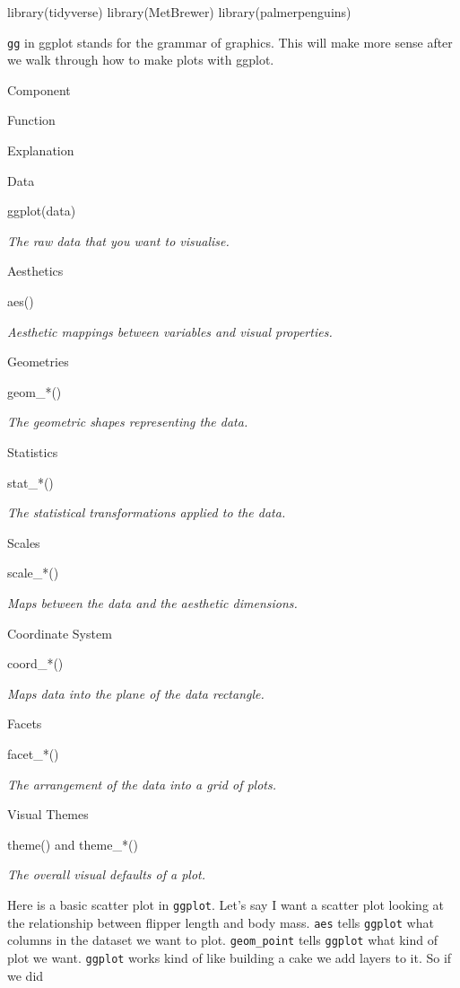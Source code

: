 \documentclass[
  letterpaper,
  DIV=11,
  numbers=noendperiod,
  oneside]{scrreprt}
\newenvironment{Shaded}{\begin{snugshade}}{\end{snugshade}}
\newcommand{\FunctionTok}[1]{\textcolor[rgb]{0.28,0.35,0.67}{#1}}
\newcommand{\NormalTok}[1]{\textcolor[rgb]{0.00,0.23,0.31}{#1}}
\begin{document}
\begin{Shaded}
\begin{Highlighting}[]
\FunctionTok{library}\NormalTok{(tidyverse)}
\FunctionTok{library}\NormalTok{(MetBrewer)}
\FunctionTok{library}\NormalTok{(palmerpenguins)}
\end{Highlighting}
\end{Shaded}

\texttt{gg} in ggplot stands for the grammar of graphics. This will make
more sense after we walk through how to make plots with ggplot.

Component

Function

Explanation

Data

ggplot(data)~~~~~~~~~

\emph{The raw data that you want to visualise.}

Aesthetics~~~~~~~~~~

aes()

\emph{Aesthetic mappings between variables and visual properties.}

Geometries

geom\_*()

\emph{The geometric shapes representing the data.}

Statistics

stat\_*()

\emph{The statistical transformations applied to the data.}

Scales

scale\_*()

\emph{Maps between the data and the aesthetic dimensions.}

Coordinate System

coord\_*()

\emph{Maps data into the plane of the data rectangle.}

Facets

facet\_*()

\emph{The arrangement of the data into a grid of plots.}

Visual Themes

theme() and theme\_*()

\emph{The overall visual defaults of a plot.}

Here is a basic scatter plot in \texttt{ggplot}. Let's say I want a
scatter plot looking at the relationship between flipper length and body
mass. \texttt{aes} tells \texttt{ggplot} what columns in the dataset we
want to plot. \texttt{geom\_point} tells \texttt{ggplot} what kind of
plot we want. \texttt{ggplot} works kind of like building a cake we add
layers to it. So if we did
\end{document}
